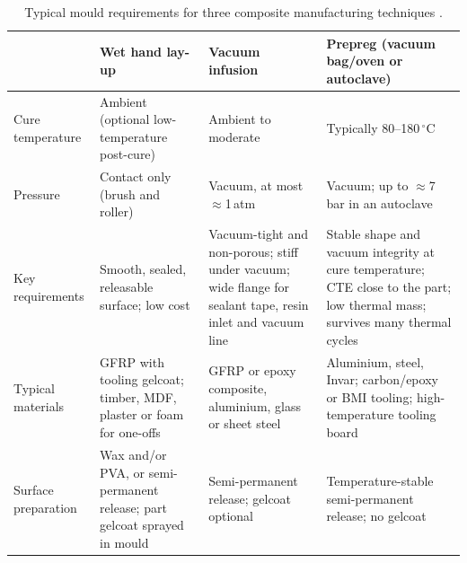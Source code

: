 \documentclass[11pt,a4paper]{article}
\newcommand{\addedfloat}{\color{addgreen}}  %
\newcommand{\addedfloat}{}
\begin{document}
\begin{table}[htbp]
    \addedfloat
    \centering
    \caption{Typical mould requirements for three composite
    manufacturing techniques \citep{campbell2004,astrom1997,williams1996,hexcel2013}.}
    \label{tab:mould_req}
    \footnotesize
    \renewcommand{\arraystretch}{1.15}
    \begin{tabularx}{\linewidth}{@{}>{\raggedright\arraybackslash}p{2.2cm}LLL@{}}
        \toprule
        & \textbf{Wet hand lay-up} & \textbf{Vacuum infusion}
        & \textbf{Prepreg (vacuum bag/oven or autoclave)} \\
        \midrule
        Cure temperature & Ambient (optional low-temperature post-cure)
            & Ambient to moderate & Typically 80--180\,$^\circ$C \\
        Pressure & Contact only (brush and roller)
            & Vacuum, at most $\approx$1\,atm
            & Vacuum; up to $\approx$7\,bar in an autoclave \\
        Key requirements & Smooth, sealed, releasable surface; low cost
            & Vacuum-tight and non-porous; stiff under vacuum; wide flange
            for sealant tape, resin inlet and vacuum line
            & Stable shape and vacuum integrity at cure temperature; CTE
            close to the part; low thermal mass; survives many thermal
            cycles \\
        Typical materials & GFRP with tooling gelcoat; timber, MDF,
            plaster or foam for one-offs & GFRP or epoxy composite,
            aluminium, glass or sheet steel & Aluminium, steel, Invar;
            carbon/epoxy or BMI tooling; high-temperature tooling board \\
        Surface preparation & Wax and/or PVA, or semi-permanent release;
            part gelcoat sprayed in mould & Semi-permanent release;
            gelcoat optional & Temperature-stable semi-permanent release;
            no gelcoat \\
        \bottomrule
    \end{tabularx}
\end{table}
\end{document}

